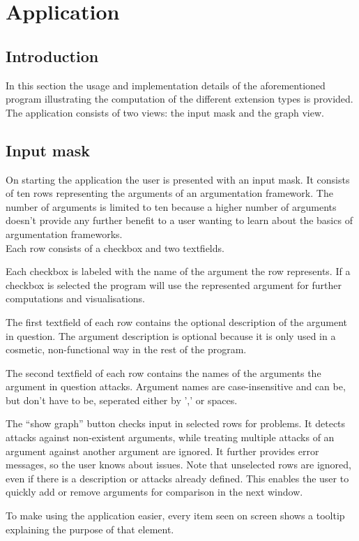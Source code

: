 \documentclass[draft,final]{vutinfth} %
\newcommand{\hl}{\par\vspace{6pt}} %
\begin{document}
\chapter{Application}

\section{Introduction}
In this section the usage and implementation details of the aforementioned program illustrating the computation of the different extension types is provided. The application consists of two views: the input mask and the graph view.

\section{Input mask}
On starting the application the user is presented with an input mask. It consists of ten rows representing the arguments of an argumentation framework. The number of arguments is limited to ten because a higher number of arguments doesn't provide any further benefit to a user wanting to learn about the basics of argumentation frameworks.\\
Each row consists of a checkbox and two textfields.\hl
Each checkbox is labeled with the name of the argument the row represents. If a checkbox is selected the program will use the represented argument for further computations and visualisations.\hl
The first textfield of each row contains the optional description of the argument in question. The argument description is optional because it is only used in a cosmetic, non-functional way in the rest of the program.\hl
The second textfield of each row contains the names of the arguments the argument in question attacks. Argument names are case-insensitive and can be, but don't have to be, seperated either by ',' or spaces.\hl
The ``show graph'' button checks input in selected rows for problems. It detects attacks against non-existent arguments, while treating multiple attacks of an argument against another argument are ignored. It further provides error messages, so the user knows about issues. Note that unselected rows are ignored, even if there is a description or attacks already defined. This enables the user to quickly add or remove arguments for comparison in the next window.\hl
To make using the application easier, every item seen on screen shows a tooltip explaining the purpose of that element.
\end{document}
